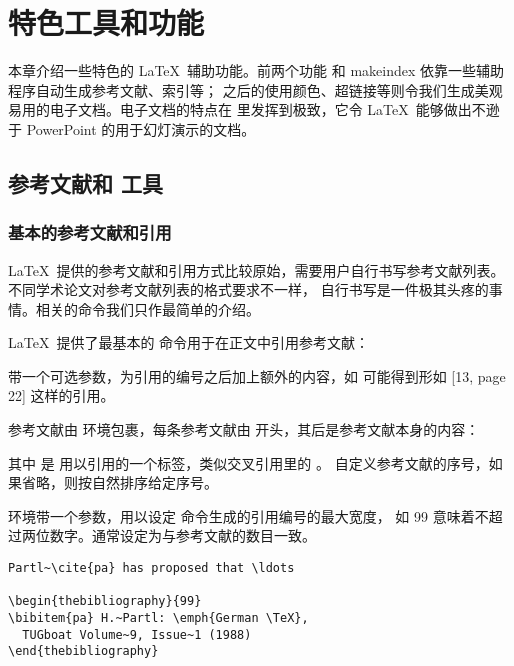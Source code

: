 \chapter{特色工具和功能}

\begin{intro}
本章介绍一些特色的 \LaTeX\ 辅助功能。前两个功能  和 makeindex 依靠一些辅助程序自动生成参考文献、索引等；
之后的使用颜色、超链接等则令我们生成美观易用的电子文档。电子文档的特点在  里发挥到极致，它令 \LaTeX\ 能够做出不逊于
PowerPoint 的用于幻灯演示的文档。
\end{intro}

\section{参考文献和  工具}

\subsection{基本的参考文献和引用}

\LaTeX\ 提供的参考文献和引用方式比较原始，需要用户自行书写参考文献列表。不同学术论文对参考文献列表的格式要求不一样，
自行书写是一件极其头疼的事情。相关的命令我们只作最简单的介绍。

\LaTeX\ 提供了最基本的  命令用于在正文中引用参考文献：
\begin{command}
\end{command}

 带一个可选参数，为引用的编号之后加上额外的内容，如   可能得到形如 [13, page 22] 这样的引用。

参考文献由  环境包裹，每条参考文献由  开头，其后是参考文献本身的内容：
\begin{command}
\end{command}

其中  是  用以引用的一个标签，类似交叉引用里的 。
 自定义参考文献的序号，如果省略，则按自然排序给定序号。

 环境带一个参数，用以设定  命令生成的引用编号的最大宽度，
如 99 意味着不超过两位数字。通常设定为与参考文献的数目一致。

\begin{verbatim}
Partl~\cite{pa} has proposed that \ldots

\begin{thebibliography}{99}
\bibitem{pa} H.~Partl: \emph{German \TeX}, 
  TUGboat Volume~9, Issue~1 (1988)
\end{thebibliography}
\end{verbatim}

